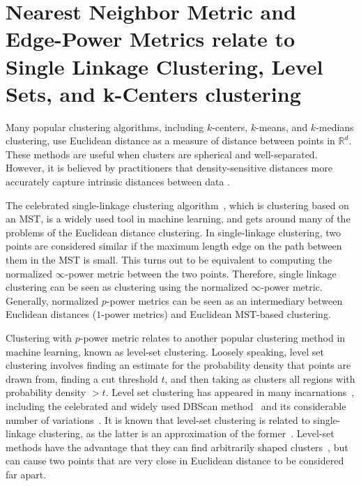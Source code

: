   \section{Nearest Neighbor Metric and Edge-Power Metrics relate to Single Linkage Clustering, Level Sets, and k-Centers
  clustering}\label{ap:clustering-link}

  Many popular clustering algorithms, including $k$-centers, $k$-means,
  and $k$-medians clustering, use Euclidean distance as a measure of
  distance between points in $\mathbb{R}^d$. These methods are useful
  when clusters are spherical and well-separated. However, it is believed by
  practitioners that
  density-sensitive distances more accurately capture intrinsic
  distances between data \cite{alamgir12shortest}.

  The celebrated single-linkage clustering algorithm~\cite{Gower1969, Yaro2017},
  which is clustering based on an MST, is a widely used tool in
  machine learning, and gets around many of the problems of the
 Euclidean distance clustering. In single-linkage clustering,
   two points are considered similar if the maximum length
   edge on the path between them in the MST is small. This turns out to be equivalent to 
  computing the normalized $\infty$-power metric between the two
  points. Therefore, single linkage clustering can be seen
  as clustering using the normalized $\infty$-power metric.
  Generally, normalized $p$-power metrics can be seen as an
  intermediary between Euclidean distances ($1$-power metrics) and
  Euclidean MST-based clustering.

  Clustering with $p$-power metric relates to another popular
 clustering method in machine learning, known as level-set clustering.
  Loosely speaking, level set clustering involves finding an estimate
  for the probability density that points are drawn from, finding a
  cut threshold $t$, and then taking as clusters all regions with
  probability density $ > t$. Level set clustering
  has appeared in many incarnations~\cite{Wishart69, Stuetzle2003, Stuetzle2007}, including the celebrated and
  widely used DBScan method~\cite{Ester1996} and its
  considerable number of variations~\cite{OPTICS96}.
It is known
  that level-set clustering is related to single-linkage clustering, as
  the latter is an approximation of the former~\cite{Wishart69,
  Stuetzle2007}.  
  Level-set methods
  have the advantage that they can find arbitrarily shaped
  clusters~\cite{Ester1996}, but can cause two points that are very
  close in Euclidean distance to be considered far apart. 

